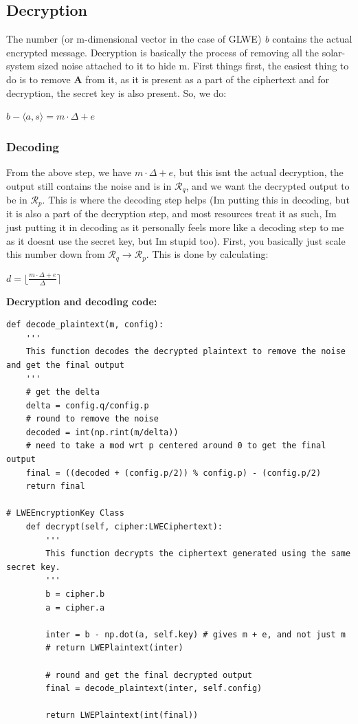 \documentclass{report}
\begin{document}
\subsection{Decryption}
The number (or m-dimensional vector in the case of GLWE) \textit{b} contains the actual encrypted message. Decryption is basically the process of removing all the solar-system sized noise attached to it to hide m. First things first, the easiest thing to do is to remove \textbf{A} from it, as it is present as a part of the ciphertext and for decryption, the secret key is also present. So, we do:
\begin{center}
  $ b - \langle a, s \rangle = m \cdot \Delta + e$
\end{center}

\subsubsection{Decoding}
From the above step, we have $ m \cdot \Delta + e $, but this isnt the actual decryption, the output still contains the noise and is in $\mathcal{R}_q$, and we want the decrypted output to be in $ \mathcal{R}_p $. This is where the decoding step helps (Im putting this in decoding, but it is also a part of the decryption step, and most resources treat it as such, Im just putting it in decoding as it personally feels more like a decoding step to me as it doesnt use the secret key, but Im stupid too). First, you basically just scale this number down from $ \mathcal{R}_q \rightarrow \mathcal{R}_p $. This is done by calculating:
\begin{center}
  $ d = \lfloor \frac{m \cdot \Delta + e} {\Delta} \rceil $
\end{center}
\textbf{Decryption and decoding code:}
\begin{verbatim}
def decode_plaintext(m, config):
	'''
	This function decodes the decrypted plaintext to remove the noise and get the final output
	'''
	# get the delta
	delta = config.q/config.p
	# round to remove the noise
	decoded = int(np.rint(m/delta))
	# need to take a mod wrt p centered around 0 to get the final output
	final = ((decoded + (config.p/2)) % config.p) - (config.p/2)
	return final
	
# LWEEncryptionKey Class
    def decrypt(self, cipher:LWECiphertext):
		'''
		This function decrypts the ciphertext generated using the same secret key.
		'''
		b = cipher.b
		a = cipher.a
		
		inter = b - np.dot(a, self.key) # gives m + e, and not just m
		# return LWEPlaintext(inter)
		
		# round and get the final decrypted output
		final = decode_plaintext(inter, self.config)
		
		return LWEPlaintext(int(final))
\end{verbatim}
\end{document}

